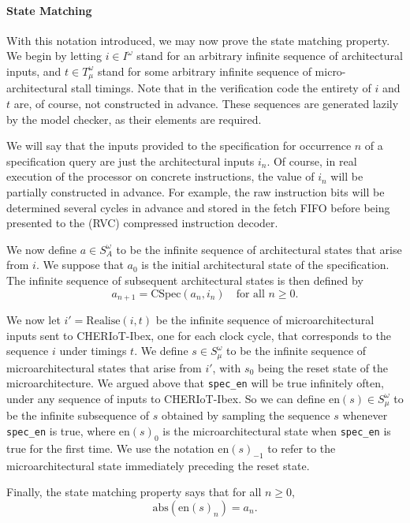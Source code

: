 \documentclass[10pt,conference]{IEEEtran}
\begin{document}
\paragraph{State Matching}

With this notation introduced, we may now prove the state matching
property.  We begin by letting $i \in I^\omega$ stand for an
arbitrary infinite sequence of architectural inputs, and $t \in T_\mu^\omega$
stand for some arbitrary infinite sequence of micro-architectural
stall timings. Note that in the verification code the entirety of $i$ and $t$ are, of course,
not constructed in advance. These sequences are generated lazily by the model
checker, as their elements are required.

We will say that the inputs provided to the specification for occurrence
$n$ of a specification query are just the architectural inputs $i_n$. Of
course, in real execution of the processor on concrete instructions, the
value of $i_n$ will be partially constructed in advance. For example, the
raw instruction bits will be determined several cycles in advance and
stored in the fetch FIFO before being presented to the (RVC) compressed instruction
decoder.

We now define $a \in S_A^\omega$ to be the infinite sequence of
architectural states that arise from $i$. We suppose that $a_0$ is the initial
architectural state of the specification. The infinite sequence of
subsequent architectural states is then defined by 
\[
a_{n{+}1} =
\mathrm{CSpec}(a_n, i_n)\quad \textrm{for all $n \ge 0$.}
\]

We now let $i' = \mathrm{Realise}(i, t)$ be the infinite sequence of
microarchitectural inputs sent to CHERIoT-Ibex, one for each clock cycle,
that corresponds to the sequence $i$ under timings $t$. We define $s \in S_{\mu}^\omega$
to be the infinite sequence of microarchitectural states that arise from
$i'$, with $s_0$ being the reset state of the microarchitecture.  We
argued above that \verb|spec_en| will be true infinitely often, under any
sequence of inputs to CHERIoT-Ibex. So we can define $\mathrm{en}(s)\in
S_{\mu}^\omega$ to be the infinite subsequence of $s$ obtained by sampling
the sequence $s$ whenever \verb|spec_en| is true, where
$\mathrm{en}(s)_0$ is the microarchitectural state when \verb|spec_en| is
true for the first time. We use the notation $\mathrm{en}(s)_{-1}$ to refer to the
microarchitectural state immediately preceding the reset state.

Finally, the state matching property says that for all $n \geq 0$,
\begin{equation}
\mathrm{abs}(\mathrm{en}(s)_n) = a_{n}.
\label{state-matching-thm}
\end{equation}
\end{document}
